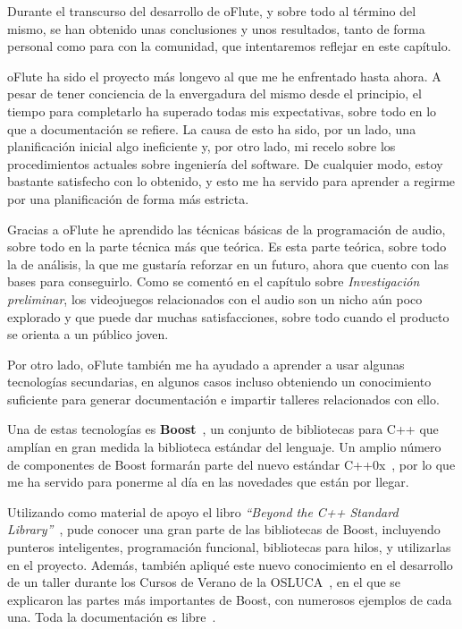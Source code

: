 Durante el transcurso del desarrollo de oFlute, y sobre todo al término del
mismo, se han obtenido unas conclusiones y unos resultados, tanto de forma
personal como para con la comunidad, que intentaremos reflejar en este capítulo.

oFlute ha sido el proyecto más longevo al que me he enfrentado hasta ahora. A
pesar de tener conciencia de la envergadura del mismo desde el principio, el
tiempo para completarlo ha superado todas mis expectativas, sobre todo en lo que
a documentación se refiere. La causa de esto ha sido, por un lado, una
planificación inicial algo ineficiente y, por otro lado, mi recelo sobre los
procedimientos actuales sobre ingeniería del software. De cualquier modo, estoy
bastante satisfecho con lo obtenido, y esto me ha servido para aprender a
regirme por una planificación de forma más estricta.

Gracias a oFlute he aprendido las técnicas básicas de la programación de audio,
sobre todo en la parte técnica más que teórica. Es esta parte teórica, sobre
todo la de análisis, la que me gustaría reforzar en un futuro, ahora que cuento
con las bases para conseguirlo. Como se comentó en el capítulo sobre
\textit{Investigación preliminar}, los videojuegos relacionados con el audio son
un nicho aún poco explorado y que puede dar muchas satisfacciones, sobre todo
cuando el producto se orienta a un público joven.

Por otro lado, oFlute también me ha ayudado a aprender a usar algunas
tecnologías secundarias, en algunos casos incluso obteniendo un conocimiento
suficiente para generar documentación e impartir talleres relacionados con ello.

Una de estas tecnologías es \textbf{Boost}~\cite{boost}, un conjunto de
bibliotecas para C++ que amplían en gran medida la biblioteca estándar del
lenguaje. Un amplio número de componentes de Boost formarán parte del nuevo
estándar C++0x~\cite{cpp0x}, por lo que me ha servido para ponerme al día en las
novedades que están por llegar.

Utilizando como material de apoyo el libro \textit{``Beyond the C++ Standard
  Library''}~\cite{libroboost}, pude conocer una gran parte de las bibliotecas
  de Boost, incluyendo punteros inteligentes, programación funcional,
  bibliotecas para hilos, y utilizarlas en el proyecto. Además, también apliqué
  este nuevo conocimiento en el desarrollo de un taller durante los Cursos de
  Verano de la OSLUCA~\cite{cursosverano}, en el que se explicaron las partes más
  importantes de Boost, con numerosos ejemplos de cada una. Toda la
  documentación es libre~\cite{materialesCursoBoost}.

